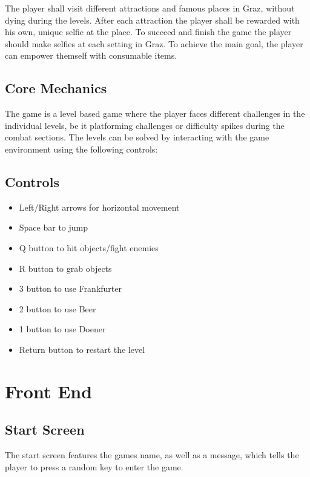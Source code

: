 \documentclass[a4paper]{scrreprt}
\begin{document}
The player shall visit different attractions and famous places in Graz, without dying during the levels. After each attraction the player shall be rewarded with his own, unique selfie at the place. To succeed and finish the game the player should make selfies at each setting in Graz. To achieve the main goal, the player can empower themself with consumable items. 

\section{Core Mechanics}

The game is a level based game where the player faces different challenges in the individual levels, be it platforming challenges or difficulty spikes during the combat sections. The levels can be solved by interacting with the game environment using the following controls:

\section{Controls}
\begin{itemize}
    \item Left/Right arrows for horizontal movement
    \item Space bar to jump
    \item Q button to hit objects/fight enemies
    \item R button to grab objects
    \item 3 button to use Frankfurter
    \item 2 button to use Beer
    \item 1 button to use Doener
    \item Return button to restart the level
\end{itemize}




\chapter{Front End}

\section{Start Screen}
The start screen features the games name, as well as a message, which tells the player to press a random key to enter the game.
\end{document}
